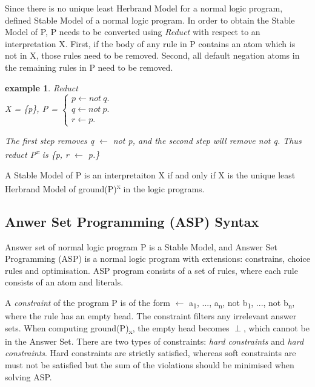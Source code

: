 \documentclass[12pt,twoside]{report}
\newtheorem{examp}{example}[section]
\begin{document}
Since there is no unique least Herbrand Model for a normal logic program, \cite{Gelfond1988} defined Stable Model of a normal logic program. In order to obtain the Stable Model of P, P needs to be converted using \textit{Reduct} with respect to an interpretation X. First, if the body of any rule in P contains an atom which is not in X, those rules need to be removed. Second, all default negation atoms in the remaining rules in P need to be removed.

\begin{examp} \normalfont Reduct \\

X = \{p\},   P = $\begin{cases}
	p  \leftarrow not\ q. \\
  q  \leftarrow not\ p. \\
  r  \leftarrow p.
      \end{cases}$

The first step removes q  $\leftarrow$ not p, and the second step will remove not q. Thus reduct P\textsuperscript{x} is \{p, r $\leftarrow$ p.\}
\end{examp}
\label{reduct}

A Stable Model of P is an interpretaiton X if and only if X is the unique least Herbrand Model of ground(P)\textsuperscript{x} in the logic programs.

\subsection{Anwer Set Programming (ASP) Syntax}

Answer set of normal logic program P is a Stable Model, and Answer Set Programming (ASP) is a normal logic program with extensions: constrains, choice rules and optimisation. ASP program consists of a set of rules, where each rule consists of an atom and literals.

A \textit{constraint} of the program P is of the form $\leftarrow$ a\textsubscript{1}, ..., a\textsubscript{n}, not b\textsubscript{1}, ..., not b\textsubscript{n}, where the rule has an empty head. The constraint filters any irrelevant answer sets. When computing ground(P)\textsubscript{x}, the empty head becomes $\perp$, which cannot be in the Answer Set.
There are two types of constraints: \textit{hard constraints} and \textit{hard constraints}. Hard constraints are strictly satisfied, whereas soft constraints are must not be satisfied but the sum of the violations should be minimised when solving ASP.
\end{document}
